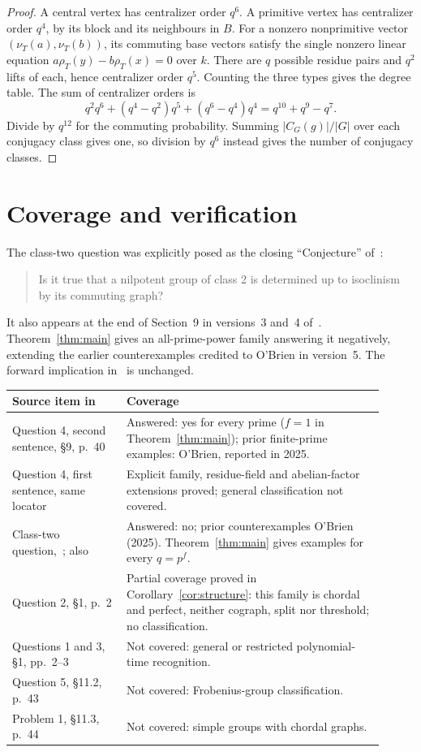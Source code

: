 \documentclass[11pt]{article}
\begin{document}
\begin{proof}
A central vertex has centralizer order $q^6$. A primitive vertex has
centralizer order $q^4$, by its block and its neighbours in $B$.
For a nonzero nonprimitive vector $(\nu_T(a),\nu_T(b))$, its commuting base
vectors satisfy the single nonzero linear equation
$a\rho_T(y)-b\rho_T(x)=0$ over $k$. There are $q$ possible residue
pairs and $q^2$ lifts of each, hence centralizer order $q^5$.
Counting the three types gives the degree table.
The sum of centralizer orders is
\[
 q^2q^6+(q^4-q^2)q^5+(q^6-q^4)q^4=q^{10}+q^9-q^7.
\]
Divide by $q^{12}$ for the commuting probability. Summing
$|C_G(g)|/|G|$ over each conjugacy class gives one, so division
by $q^6$ instead gives the number of conjugacy classes.
\end{proof}

\section{Coverage and verification}
The class-two question was explicitly posed as the closing ``Conjecture''
of~\cite[Section~8, p.~21]{AC}:
\begin{quote}
Is it true that a nilpotent group of class 2 is determined up to
isoclinism by its commuting graph?
\end{quote}
It also appears at the end of Section~9 in versions~3 and~4 of~\cite{ACMM}.
Theorem~\ref{thm:main} gives an all-prime-power family answering it
negatively, extending the earlier counterexamples credited to O'Brien
in version~5.
The forward implication in~\cite[Theorem~9.1]{ACMM} is unchanged.
\begin{center}
\small
\begin{tabular}{p{0.28\linewidth}p{0.63\linewidth}}
\toprule
Source item in~\cite{ACMM} & Coverage\\
\midrule
Question 4, second sentence, \S9, p.~40 & Answered: yes for every prime
($f=1$ in Theorem~\ref{thm:main}); prior finite-prime examples:
O'Brien, reported in 2025.\\
Question 4, first sentence, same locator & Explicit family, residue-field
and abelian-factor extensions proved; general classification not covered.\\
Class-two question,~\cite[\S8, p.~21]{AC}; also~\cite[v3, p.~28;
v4, p.~38]{ACMM} & Answered: no; prior counterexamples O'Brien (2025).
Theorem~\ref{thm:main} gives examples for every $q=p^f$.\\
Question 2, \S1, p.~2 & Partial coverage proved in Corollary~\ref{cor:structure}:
this family is chordal and perfect, neither cograph, split nor threshold;
no classification.\\
Questions 1 and 3, \S1, pp.~2--3 & Not covered: general or restricted
polynomial-time recognition.\\
Question 5, \S11.2, p.~43 & Not covered: Frobenius-group classification.\\
Problem 1, \S11.3, p.~44 & Not covered: simple groups with chordal graphs.\\
\bottomrule
\end{tabular}
\end{center}
\end{document}

